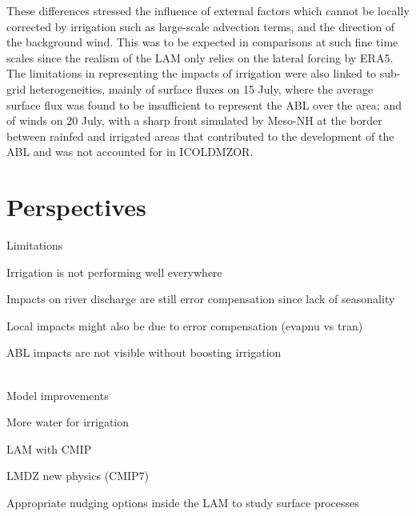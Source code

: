 These differences stressed the influence of external factors which cannot be locally corrected by irrigation such as large-scale advection terms, and the direction of the background wind. This was to be expected in comparisons at such fine time scales since the realism of the LAM only relies on the lateral forcing by ERA5.
The limitations in representing the impacts of irrigation were also linked to sub-grid heterogeneities, mainly of surface fluxes on 15 July, where the average surface flux was found to be insufficient to represent the ABL over the area; and of winds on 20 July, with a sharp front simulated by Meso-NH at the border between rainfed and irrigated areas that contributed to the development of the ABL and was not accounted for in ICOLDMZOR.

\section{Perspectives}
Limitations

Irrigation is not performing well everywhere

Impacts on river discharge are still error compensation since lack of seasonality

Local impacts might also be due to error compensation (evapnu vs tran)

ABL impacts are not visible without boosting irrigation

\hfill\\
Model improvements

More water for irrigation


LAM with CMIP

LMDZ new physics (CMIP7)

Appropriate nudging options inside the LAM to study surface processes

